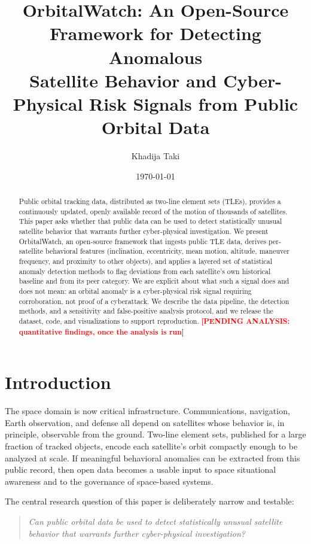 \documentclass[11pt]{article}
\title{OrbitalWatch: An Open-Source Framework for Detecting Anomalous\\
Satellite Behavior and Cyber-Physical Risk Signals from Public Orbital Data}
\author[1]{Khadija Taki}
\affil[1]{Heinz College of Information Systems and Public Policy, Carnegie Mellon University\\ \texttt{\fill{preferred contact email}}}
\date{\today}
\newcommand{\pending}[1]{\textcolor{red}{\textbf{[PENDING ANALYSIS: #1]}}}
\begin{document}
\maketitle

\begin{abstract}
Public orbital tracking data, distributed as two-line element sets (TLEs),
provides a continuously updated, openly available record of the motion of
thousands of satellites. This paper asks whether that public data can be used to
detect statistically unusual satellite behavior that warrants further
cyber-physical investigation. We present OrbitalWatch, an open-source framework
that ingests public TLE data, derives per-satellite behavioral features
(inclination, eccentricity, mean motion, altitude, maneuver frequency, and
proximity to other objects), and applies a layered set of statistical anomaly
detection methods to flag deviations from each satellite's own historical
baseline and from its peer category. We are explicit about what such a signal
does and does not mean: an orbital anomaly is a cyber-physical risk signal
requiring corroboration, not proof of a cyberattack. We describe the data
pipeline, the detection methods, and a sensitivity and false-positive analysis
protocol, and we release the dataset, code, and visualizations to support
reproduction. \pending{quantitative findings, once the analysis is run}
\end{abstract}

\section{Introduction}

The space domain is now critical infrastructure. Communications, navigation,
Earth observation, and defense all depend on satellites whose behavior is, in
principle, observable from the ground. Two-line element sets, published for a
large fraction of tracked objects, encode each satellite's orbit compactly
enough to be analyzed at scale. If meaningful behavioral anomalies can be
extracted from this public record, then open data becomes a usable input to
space situational awareness and to the governance of space-based systems.

The central research question of this paper is deliberately narrow and testable:

\begin{quote}
\emph{Can public orbital data be used to detect statistically unusual satellite
behavior that warrants further cyber-physical investigation?}
\end{quote}
\end{document}
